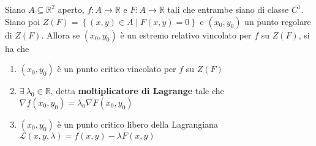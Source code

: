 \begin{theorem} \label{Teo: Moltiplicatore di Lagrange}
Siano $A \subseteq \mathbb{R}^2$ aperto, $f: A \to \mathbb{R}$ e $F: A \to \mathbb{R}$ tali che entrambe siano di classe $C^1$. Siano poi $Z(F)= \left\{ (x,y) \in A \mid F(x,y)=0\right\}$ e $(x_0,y_0)$ un punto regolare di $Z(F)$. Allora se $(x_0, y_0)$ è un estremo relativo vincolato per $f$ su $Z(F)$, si ha che
\begin{enumerate}
    \item $(x_0, y_0)$ è un punto critico vincolato per $f$ su $Z(F)$
    \item  $\exists\ \lambda_0 \in \mathbb{R}$, detta \textbf{moltiplicatore di Lagrange} tale che $\nabla f(x_0, y_0)= \lambda_0 \nabla F(x_0, y_0)$
    \item $(x_0, y_0)$ è un punto critico libero della Lagrangiana $\mathcal{L}(x, y, \lambda)=f(x,y)- \lambda F(x, y)$
\end{enumerate}
\end{theorem}